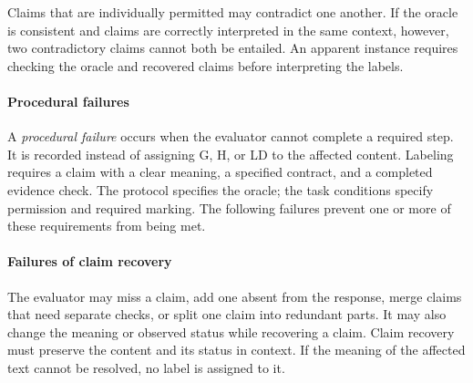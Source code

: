 \documentclass{clv2025}
\newcommand{\LD}{\textsc{LD}}
\newcommand{\Hall}{\textsc{H}}
\newcommand{\Grd}{\textsc{G}}
\begin{document}
Claims that are individually permitted may contradict one another. If the
oracle is consistent and claims are correctly interpreted in the same context,
however, two contradictory claims cannot both be entailed. An apparent instance
requires checking the oracle and recovered claims before interpreting the labels.

\paragraph{Procedural failures}

A \emph{procedural failure} occurs when the evaluator cannot complete a
required step. It is recorded instead of assigning \Grd, \Hall, or \LD{} to
the affected content. Labeling requires a claim with a clear meaning, a
specified contract, and a completed evidence check. The protocol specifies
the oracle; the task conditions specify permission and required marking.
The following failures prevent one or more of these requirements from being met.

\paragraph{Failures of claim recovery}
The evaluator may miss a claim, add one absent from the response, merge claims
that need separate checks, or split one claim into redundant parts. It may
also change the meaning or observed status while recovering a claim.
Claim recovery must preserve the content and its status in context. If the meaning of the affected text
cannot be resolved, no label is assigned to it.
\end{document}
